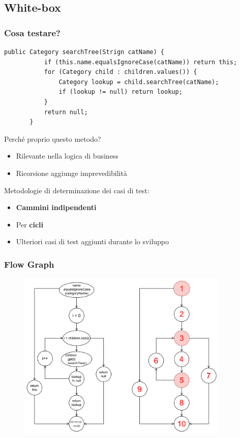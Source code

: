 \subsection{White-box}
\beamertitle
\begin{frame} [fragile]
    \frametitle{Cosa testare?}
    \begin{lstlisting}[autogobble, title={\texttt{Category.java}}]
       public Category searchTree(Strign catName) {
           if (this.name.equalsIgnoreCase(catName)) return this;
           for (Category child : children.values()) {
               Category lookup = child.searchTree(catName);
               if (lookup != null) return lookup;
           }
           return null;
       }
    \end{lstlisting}
    Perché proprio questo metodo?
    \begin{itemize}
        \item Rilevante nella logica di business
        \item Ricorsione aggiunge imprevedibilità
    \end{itemize}
    Metodologie di determinazione dei casi di test:
    \begin{itemize}
        \item \textbf{Cammini indipendenti}
        \item Per \textbf{cicli}
        \item Ulteriori casi di test aggiunti durante lo sviluppo
    \end{itemize}
\end{frame}

\begin{frame}
    \frametitle{Flow Graph}
    \begin{figure}
        \includegraphics[width=0.9\textwidth]{img/flowGraphSearchTree.png}
    \end{figure}
\end{frame}

